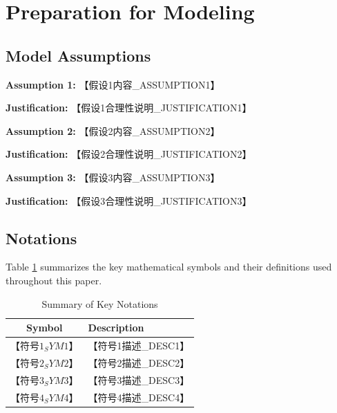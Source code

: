 \documentclass{mcmthesis}
\begin{document}
\section{Preparation for Modeling}

\subsection{Model Assumptions}

\textbf{Assumption 1:} 【假设1内容_ASSUMPTION1】

\textbf{Justification:} 【假设1合理性说明_JUSTIFICATION1】

\textbf{Assumption 2:} 【假设2内容_ASSUMPTION2】

\textbf{Justification:} 【假设2合理性说明_JUSTIFICATION2】

\textbf{Assumption 3:} 【假设3内容_ASSUMPTION3】

\textbf{Justification:} 【假设3合理性说明_JUSTIFICATION3】


\subsection{Notations}

Table \ref{tab:notations} summarizes the key mathematical symbols and their definitions used throughout this paper.

\begin{table}[H]
\centering
\caption{Summary of Key Notations}
\label{tab:notations}
\begin{tabular}{cl}
\toprule
\textbf{Symbol} & \textbf{Description} \\
\midrule
$【符号1_SYM1】$ & 【符号1描述_DESC1】 \\
$【符号2_SYM2】$ & 【符号2描述_DESC2】 \\
$【符号3_SYM3】$ & 【符号3描述_DESC3】 \\
$【符号4_SYM4】$ & 【符号4描述_DESC4】 \\
\bottomrule
\end{tabular}
\end{table}
\end{document}
